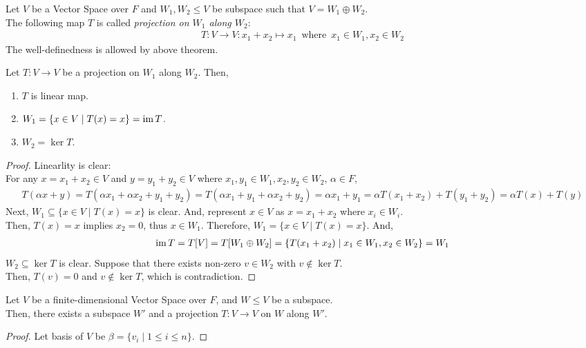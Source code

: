 \begin{definition}
    Let $V$ be a Vector Space over $F$ and $W_1, W_2 \leq V$ be subspace such that $V = W_1 \oplus W_2$. \\
    The following map $T$ is called \textit{projection on $W_1$ along $W_2$}:
    \begin{align*}
        T:V \to V:x_1 + x_2 \mapsto x_1 \ \operatorname{where} \ x_1 \in W_1, x_2 \in W_2
    \end{align*}
    The well-definedness is allowed by above theorem.
\end{definition}
\begin{theorem}
    Let $T:V \to V$ be a projection on $W_1$ along $W_2$. Then,
    \begin{enumerate}
        \item $T$ is linear map.
        \item $W_1 = \{x \in V \mid T(x) = x\} = \operatorname{im} T$.
        \item $W_2 = \ker T$.
    \end{enumerate}
\end{theorem}
\begin{proof}
    Linearlity is clear: \\
    For any $x = x_1 + x_2 \in V$ and $y = y_1 + y_2 \in V$ where $x_1, y_1 \in W_1, x_2, y_2 \in W_2$, $\alpha \in F$,
    \begin{align*}
        T(\alpha x + y)
        = T(\alpha x_1 + \alpha x_2 + y_1 + y_2)
        = T(\alpha x_1 + y_1 + \alpha x_2 + y_2)
        = \alpha x_1 + y_1
        = \alpha T(x_1 + x_2) + T(y_1 + y_2)
        = \alpha T(x) + T(y)
    \end{align*}
    Next, $W_1 \subseteq \{x \in V \mid T(x) = x\}$ is clear.
    And, represent $x \in V$ as $x = x_1 + x_2$ where $x_i \in W_i$. \\
    Then, $T(x) = x$ implies $x_2 = 0$, thus $x \in W_1$. Therefore, $W_1 = \{x \in V \mid T(x) = x\}$. And,
    \begin{align*}
        \operatorname{im} T = T[V] 
        = T[W_1 \oplus W_2] 
        = \{T(x_1 + x_2) \mid x_1 \in W_1, x_2 \in W_2\}
        = W_1
    \end{align*}
    $W_2 \subseteq \ker T$ is clear. Suppose that there exists non-zero $v \in W_2$ with $v \notin \ker T$. \\
    Then, $T(v) = 0$ and $v \notin \ker T$, which is contradiction.
\end{proof}

\begin{theorem}
    Let $V$ be a finite-dimensional Vector Space over $F$, and $W \leq V$ be a subspace. \\
    Then, there exists a subspace $W'$ and a projection $T:V \to V$ on $W$ along $W'$.
\end{theorem}
\begin{proof}
    Let basis of $V$ be $\beta = \{v_i \mid 1 \leq i \leq n\}$.
\end{proof}